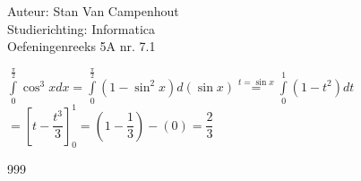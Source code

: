 \documentclass[a4paper]{article}
\begin{document}
  
\noindent \large Auteur: Stan Van Campenhout \\
\noindent \large Studierichting:  Informatica\\
\noindent \large Oefeningenreeks 5A nr. 7.1\\

\medskip

\normalsize

$ \displaystyle\int\limits_0^{\tfrac{\pi}{2}}\cos^3xdx = \displaystyle\int\limits_0^{\tfrac{\pi}{2}}\left(1-\sin^2x\right)d\left(\sin x\right) 
\stackrel{t = \sin x}{=} \displaystyle\int\limits_0^1\left(1-t^2\right)dt $\\

$ = \left[t-\dfrac{t^3}{3}\right]_0^1 = \left(1-\dfrac{1}{3}\right) - \left(0\right) = \dfrac{2}{3} $\\

\begin{thebibliography}{999}
\end{thebibliography}
\end{document}
